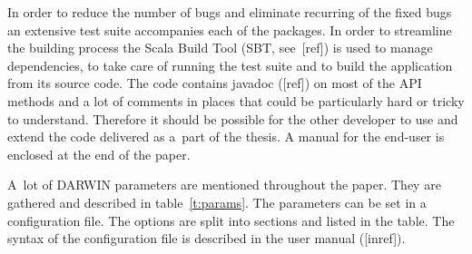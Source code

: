 In order to reduce the number of bugs and eliminate recurring of the fixed
bugs an extensive test suite accompanies each of the packages. In order to
streamline the building process the Scala Build Tool (SBT, see~[ref]) is used
to manage dependencies, to take care of running the test suite and to build
the application from its source code. The code contains javadoc ([ref]) on
most of the API methods and a lot of comments in places that could be
particularly hard or tricky to understand. Therefore it should be possible for
the other developer to use and extend the code delivered as a~part of the
thesis. A manual for the end-user is enclosed at the end of the paper.

A~lot of DARWIN parameters are mentioned throughout the paper. They are gathered
and described in table~\ref{t:params}. The parameters can be set in a
configuration file. The options are split into sections and listed in the
table. The syntax of the configuration file is described in the user manual
([inref]).

